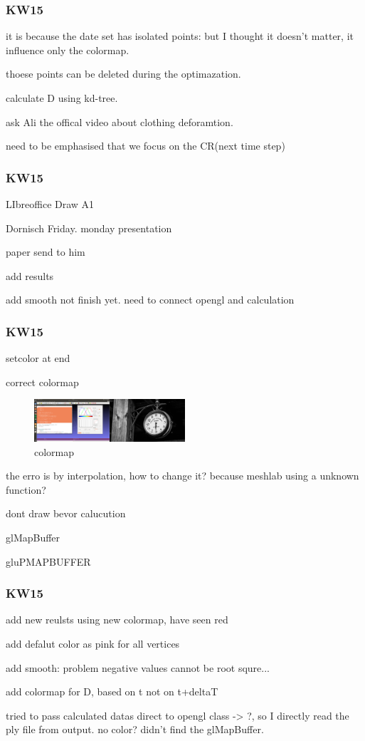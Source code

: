 \documentclass{beamer}
\begin{document}

\begin{frame}
\frametitle{KW15}
it is because the date set has isolated points: but I thought it doesn't matter, it influence only the colormap.

thoese points can be deleted during the optimazation.

calculate D using kd-tree.

ask Ali the offical video about clothing deforamtion.

need to be emphasised that we focus on the CR(next time step)
\end{frame}

\begin{frame}
\frametitle{KW15}
LIbreoffice Draw A1

Dornisch Friday. monday presentation

paper send to him

add results

add smooth not finish yet. need to connect opengl and calculation
\end{frame}

\begin{frame}
\frametitle{KW15}
setcolor at end

correct colormap 
\begin{figure}
\centering
\includegraphics[width=0.5\textwidth]{image//colormap_error.png}
\caption{colormap}
\end{figure}
the erro is by interpolation, how to change it? because meshlab using a unknown function?

dont draw bevor calucution

glMapBuffer

gluPMAPBUFFER
\end{frame}

\begin{frame}
\frametitle{KW15}
add new reulsts using new colormap, have seen red

add defalut color as pink for all vertices

add smooth: problem negative values cannot be root squre...

add colormap for D, based on t not on t+deltaT

tried to pass calculated datas direct to opengl class -> ?, so I directly read the ply file from output. no color? didn't find the glMapBuffer.
\end{frame}
\end{document}
